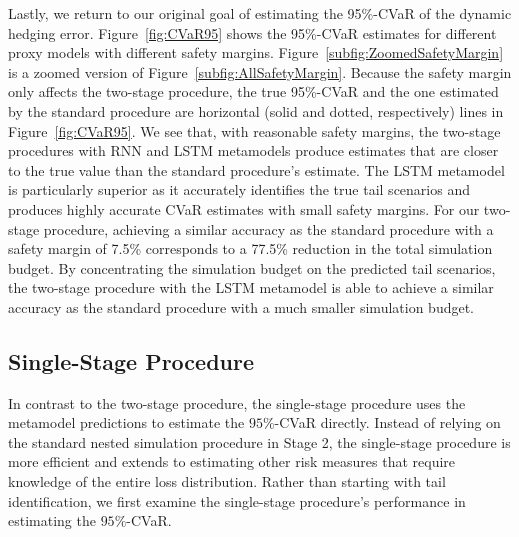 \documentclass{article}
\begin{document}
Lastly, we return to our original goal of estimating the 95\%-CVaR of the dynamic hedging error.
Figure~\ref{fig:CVaR95} shows the 95\%-CVaR estimates for different proxy models with different safety margins.
Figure~\ref{subfig:ZoomedSafetyMargin} is a zoomed version of Figure~\ref{subfig:AllSafetyMargin}.
Because the safety margin only affects the two-stage procedure, the true 95\%-CVaR and the one estimated by the standard procedure are horizontal (solid and dotted, respectively) lines in Figure~\ref{fig:CVaR95}.
We see that, with reasonable safety margins, the two-stage procedures with RNN and LSTM metamodels produce estimates that are closer to the true value than the standard procedure's estimate.
The LSTM metamodel is particularly superior as it accurately identifies the true tail scenarios and produces highly accurate CVaR estimates with small safety margins.
For our two-stage procedure, achieving a similar accuracy as the standard procedure with a safety margin of 7.5\% corresponds to a 77.5\% reduction in the total simulation budget.
By concentrating the simulation budget on the predicted tail scenarios, the two-stage procedure with the LSTM metamodel is able to achieve a similar accuracy as the standard procedure with a much smaller simulation budget.

\subsection{Single-Stage Procedure}
In contrast to the two-stage procedure, the single-stage procedure uses the metamodel predictions to estimate the $95\%$-CVaR directly.
Instead of relying on the standard nested simulation procedure in Stage 2, the single-stage procedure is more efficient and extends to estimating other risk measures that require knowledge of the entire loss distribution.
Rather than starting with tail identification, we first examine the single-stage procedure's performance in estimating the $95\%$-CVaR.

\end{document}
